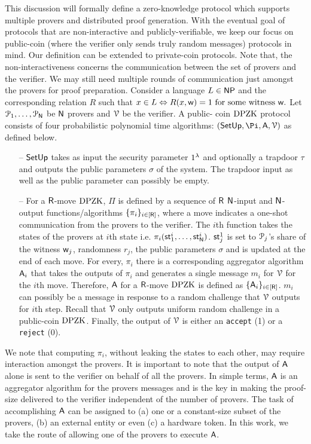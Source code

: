 This discussion will formally define a zero-knowledge protocol which supports multiple provers and distributed proof generation. With the eventual goal of protocols that are non-interactive  and publicly-verifiable,  we keep our focus on  public-coin (where the verifier only sends truly random messages) protocols in mind.  Our definition can be extended to private-coin protocols. Note that, the non-interactiveness concerns the communication between the set of provers and the verifier. We may still need multiple rounds of communication just amongst the provers for proof preparation.  Consider a language $L \in \mathsf{NP}$ and the corresponding relation $R$ such that
$
{x} \in L \Leftrightarrow R({x}, \mathsf{w})=1 \text{ for some witness } \mathsf{w}.
$
Let $\mathcal{P}_1, \ldots, \mathcal{P}_{\mathsf{N}}$ be $\mathsf{N}$ provers and $\mathcal{V}$ be the verifier.
A public- coin $\text{DPZK}$ protocol consists of four probabilistic polynomial time algorithms: $(\setup, \Pi, \Ag, \verifier)$ as defined below. 
\begin{itemize}
	\item[--] $\mathsf{SetUp}$ takes as input the security parameter $1^{\lambda}$ and optionally a trapdoor $\tau$ and outputs the public parameters $\sigma$ of the system. The trapdoor input as well as the public parameter can possibly be empty.
	\item[--] For a $\mathsf{R}$-move $\text{DPZK}$, $\Pi$ is defined by a sequence of $\mathsf{R}$ $\mathsf{N}$-input and $\mathsf{N}$-output functions/algorithms   $\{\pi_i\}_{i \in [\mathsf{R}]}$, where a move indicates a one-shot communication from the provers to the verifier.  The $i$th function takes the states of the provers at $i$th state i.e. $\pi_i(\mathsf{st}^i_1, \ldots, \mathsf{st}^i_{\mathsf{N}})$. $\mathsf{st}^1_j$ is set to  $\mathcal{P}_j$'s share of the witness $\mathsf{w}_j$, randomness $r_j$, the public parameters $\sigma$ and is updated at the end of each move.  For every, $\pi_i$ there is a corresponding aggregator algorithm $\mathsf{A}_i$ that takes the outputs of $\pi_i$ and generates a single message  $m_i$ for $\mathcal{V}$ for the $i$th move. Therefore, $\mathsf{A}$ for a $\mathsf{R}$-move $\text{DPZK}$ is defined as $\{\mathsf{A}_i\}_{i \in [\mathsf{R}]}$.  $m_i$ can possibly be  a message in response to a random challenge that $\mathcal{V}$ outputs for $i$th step. Recall that $\mathcal{V}$ only outputs uniform random challenge in a public-coin $\text{DPZK}$. Finally, the output of $\mathcal{V}$ is either an {\tt accept} (1) or a {\tt reject} (0).
\end{itemize}
We note that computing $\pi_i$, without leaking the states to each other, may require interaction amongst the provers. It is important to note that the output of $\mathsf{A}$ alone is sent to the verifier on behalf of all the provers. In simple terms,  $\mathsf{A}$ is an aggregator algorithm for the provers messages and is the key in making the proof-size delivered to the verifier independent of the number of provers.  The task of accomplishing $\mathsf{A}$ can be assigned to (a) one or a constant-size subset of the provers, (b) an external entity or even (c) a hardware token.  In this work, we take the route of allowing one of the provers to execute $\mathsf{A}$.

